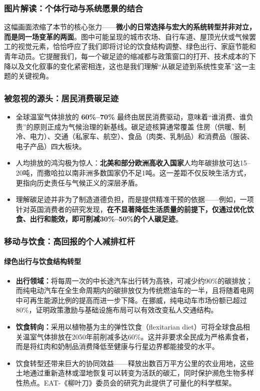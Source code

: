 \documentclass[11pt]{beamer}
\begin{document}
\begin{frame}
\frametitle{图片解读：个体行动与系统愿景的结合}
这幅画面浓缩了本节的核心张力——\textbf{微小的日常选择与宏大的系统转型并非对立，而是同一场变革的两面}。图中可能呈现的城市农场、自行车道、屋顶光伏或气候罢工的视觉元素，恰恰呼应了我们即将讨论的饮食结构调整、绿色出行、家庭节能和青年动员。它提醒我们，\alert{每一个碳足迹的缩减都与政策窗口的打开、技术成本的下降以及文化叙事的变化紧密相连}，这也是我们理解“从碳足迹到系统性变革”这一主题的关键视角。
\end{frame}

\begin{frame}
\frametitle{被忽视的源头：居民消费碳足迹}
\begin{itemize}
    \item 全球温室气体排放的 \textbf{60\%--70\%} 最终由居民消费驱动，意味着“谁消费、谁负责”的原则正成为气候治理的新基线。碳足迹核算通常覆盖 \alert{住房（供暖、制冷、电力）}、\alert{交通（私家车、航空）}、\alert{食品（肉类、乳制品）}和\alert{消费品（服装、电子产品）}四大板块。
    \item 人均排放的鸿沟极为惊人：\textbf{北美和部分欧洲高收入国家}人均年碳排放可达15--20吨，而\alert{撒哈拉以南非洲多数国家仍不足1吨}。这一差距不仅反映生活方式，更指向历史责任与气候正义的深层矛盾。
    \item 理解碳足迹并非为了制造道德负担，而是提供精准干预的依据——例如，一项针对英国消费者的研究发现，\textbf{在不显著降低生活质量的前提下，仅通过优化饮食、出行和能效，即可削减30\%--50\%的个人碳足迹}。
\end{itemize}
\end{frame}

\begin{frame}
\frametitle{移动与饮食：高回报的个人减排杠杆}
\framesubtitle{绿色出行与饮食结构转型}
\begin{itemize}
    \item \textbf{出行领域：}将每周一次的中长途汽车出行转为高铁，可\alert{减少约90\%的碳排放}；而纯电动汽车在全生命周期内的碳排放仅为传统燃油车的一半，且将随着电网中可再生能源比例的提高而进一步下降。在挪威，纯电动车市场份额已超过80\%，证明政策激励与基础设施布局可以有效改变私人交通结构。
    \item \textbf{饮食转向：}采用以植物基为主的弹性饮食（flexitarian diet）可将\alert{全球食品相关温室气体排放在2050年前削减多达60\%}。这并非要求全民成为严格素食者，而是将红肉和奶制品消费降低至健康与行星边界都能接受的水平。
    \item 饮食转型还带来巨大的\alert{协同效益}——释放出数百万平方公里的农业用地，这些土地通过重新造林或湿地恢复可以转变为活跃的碳汇，同时保护濒危生物多样性热点。EAT-《柳叶刀》委员会的研究为此提供了可量化的科学框架。
\end{itemize}
\end{frame}
\end{document}
